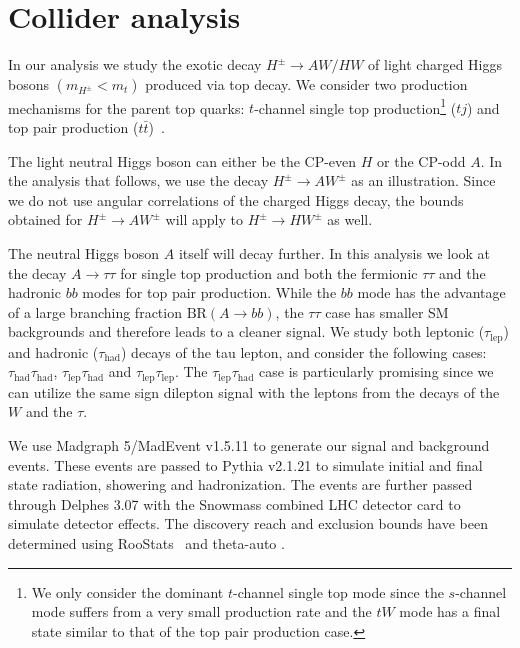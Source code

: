 \section{Collider analysis}\label{sec:light_charged_analysis}

In our analysis we study the exotic decay $H^{\pm} \rightarrow AW/HW$ of light charged Higgs bosons $(m_{H^{\pm}}<m_t)$ produced via top decay. We consider two production mechanisms for the parent top quarks: $t$-channel single top production\footnote{We only consider the dominant $t$-channel single top mode since the $s$-channel mode suffers from a very small production rate and the $tW$ mode has a final state similar to that of the top pair production case.} ($tj$) and top pair production ($t\bar{t}$)~\cite{Kidonakis:2012db}.

The light neutral Higgs boson can either be the CP-even $H$ or the CP-odd $A$. In the analysis that follows, we use the decay $H^{\pm} \rightarrow A W^{\pm}$ as an illustration. Since we do not use angular correlations of the charged Higgs decay, the bounds obtained for $H^{\pm} \rightarrow A W^{\pm}$ will apply to $H^{\pm} \rightarrow H W^{\pm}$ as well.

The neutral Higgs boson $A$ itself will decay further. In this analysis we look at the decay $A \rightarrow\tau\tau$ for single top production and both the fermionic $\tau\tau$ and the hadronic $bb$ modes for top pair production. While the $bb$ mode has the advantage of a large branching fraction $\text{BR}(A \rightarrow bb)$, the $\tau\tau$ case has smaller SM backgrounds and therefore leads to a cleaner signal. We study both leptonic ($\tau_\text{lep}$) and hadronic ($\tau_\text{had}$) decays of the tau lepton, and consider the following cases: $\tau_\text{had}\tau_\text{had}$, $\tau_\text{lep}\tau_\text{had}$ and $\tau_\text{lep}\tau_\text{lep}$. The $\tau_\text{lep}\tau_\text{had}$ case is particularly promising since we can utilize the same sign dilepton signal with the leptons from the decays of the $W$ and the $\tau$. 

We use Madgraph 5/MadEvent v1.5.11 \cite{Alwall2014} to generate our signal and background events. These events are passed to Pythia v2.1.21 \cite{Sjostrand:2006za} to simulate initial and final state radiation, showering and hadronization. The events are further passed through Delphes 3.07 \cite{DeFavereau2014a} with the Snowmass combined LHC detector card \cite{Anderson:2013kxz} to simulate detector effects. The discovery reach and exclusion bounds have been determined using RooStats~\cite{Moneta:2010pm} and theta-auto \cite{thetaauto}. 


